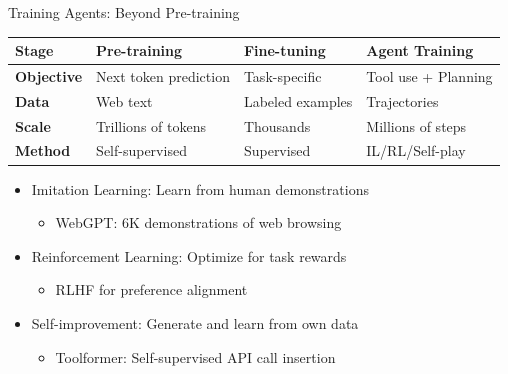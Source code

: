 \documentclass[aspectratio=169]{beamer}
\begin{document}
\begin{frame}{Training Agents: Beyond Pre-training}
	\begin{tabular}{|l|p{3cm}|p{3cm}|p{3cm}|}
		\hline
		\textbf{Stage} & \textbf{Pre-training} & \textbf{Fine-tuning} & \textbf{Agent Training} \\
		\hline
		\textbf{Objective} & Next token prediction & Task-specific & Tool use + Planning \\
		\hline
		\textbf{Data} & Web text & Labeled examples & Trajectories \\
		\hline
		\textbf{Scale} & Trillions of tokens & Thousands & Millions of steps \\
		\hline
		\textbf{Method} & Self-supervised & Supervised & IL/RL/Self-play \\
		\hline
	\end{tabular}
	
	\vspace{0.5cm}
	
	\begin{itemize}
		\item {\color{highlight}Imitation Learning}: Learn from human demonstrations
		\begin{itemize}
			\item WebGPT: 6K demonstrations of web browsing
		\end{itemize}
		\item {\color{highlight}Reinforcement Learning}: Optimize for task rewards
		\begin{itemize}
			\item RLHF for preference alignment
		\end{itemize}
		\item {\color{highlight}Self-improvement}: Generate and learn from own data
		\begin{itemize}
			\item Toolformer: Self-supervised API call insertion
		\end{itemize}
	\end{itemize}
\end{frame}
\end{document}
